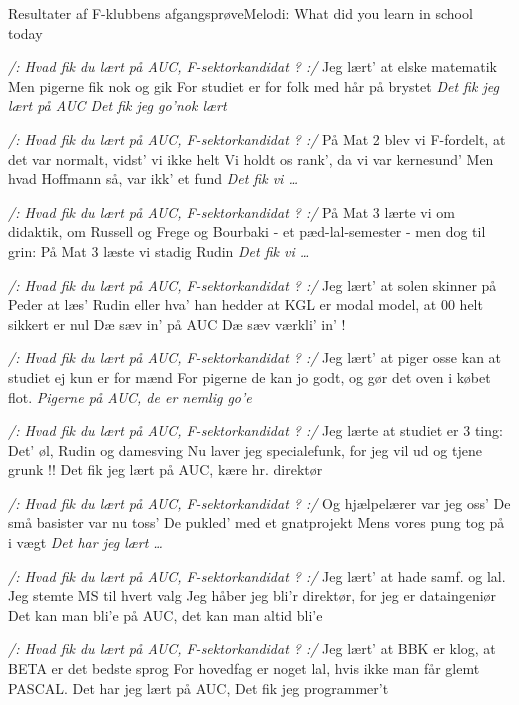 \begin{sang}{Resultater af F-klubbens afgangsprøve}{Melodi: What did you
learn in school today} 
\begin{vers}
{\em /: Hvad fik du lært på AUC, F-sektorkandidat ? :/} 
Jeg lært' at elske matematik 
Men pigerne fik nok og gik 
For studiet er for folk med hår på brystet 
{\em Det fik jeg lært på AUC 
Det fik jeg go'nok lært}
\end{vers}
\begin{vers}
{\em /: Hvad fik du lært på AUC, F-sektorkandidat ? :/} 
På Mat 2 blev vi F-fordelt, 
at det var normalt, vidst' vi ikke helt 
Vi holdt os rank', da vi var kernesund' 
Men hvad Hoffmann så, var ikk' et fund 
{\em Det fik vi \ldots}
\end{vers}
\begin{vers}
{\em /: Hvad fik du lært på AUC, F-sektorkandidat ? :/} 
På Mat 3 lærte vi om didaktik, 
om Russell og Frege og Bourbaki 
- et pæd-lal-semester - men dog til grin: 
På Mat 3 læste vi stadig Rudin 
{\em Det fik vi \ldots}
\end{vers}
\begin{vers}
{\em /: Hvad fik du lært på AUC, F-sektorkandidat ? :/} 
Jeg lært' at solen skinner på Peder 
at læs' Rudin eller hva' han hedder 
at KGL er modal model, 
at 00 helt sikkert er nul 
Dæ sæv in' på AUC 
Dæ sæv værkli' in' ! 
\end{vers}
\begin{vers}
{\em /: Hvad fik du lært på AUC, F-sektorkandidat ? :/} 
Jeg lært' at piger osse kan 
at studiet ej kun er for mænd 
For pigerne de kan jo godt, 
og gør det oven i købet flot. 
{\em Pigerne på AUC, de er nemlig go'e}
\end{vers}
\begin{vers}
{\em /: Hvad fik du lært på AUC, F-sektorkandidat ? :/} 
Jeg lærte at studiet er 3 ting: 
Det' øl, Rudin og damesving 
Nu laver jeg specialefunk, 
for jeg vil ud og tjene grunk !! 
Det fik jeg lært på AUC, 
kære hr. direktør 
\end{vers}
\begin{vers}
{\em /: Hvad fik du lært på AUC, F-sektorkandidat ? :/} 
Og hjælpelærer var jeg oss' 
De små basister var nu toss' 
De pukled' med et gnatprojekt 
Mens vores pung tog på i vægt 
{\em Det har jeg lært \ldots}
\end{vers}
\begin{vers}
{\em /: Hvad fik du lært på AUC, F-sektorkandidat ? :/} 
Jeg lært' at hade samf. og lal. 
Jeg stemte MS til hvert valg 
Jeg håber jeg bli'r direktør, 
for jeg er dataingeniør 
Det kan man bli'e på AUC, 
det kan man altid bli'e
\end{vers}
\begin{vers}
{\em /: Hvad fik du lært på AUC, F-sektorkandidat ? :/} 
Jeg lært' at BBK er klog, 
at BETA er det bedste sprog 
For hovedfag er noget lal, 
hvis ikke man får glemt PASCAL. 
Det har jeg lært på AUC, 
Det fik jeg programmer't
\end{vers}
\laps
\end{sang}